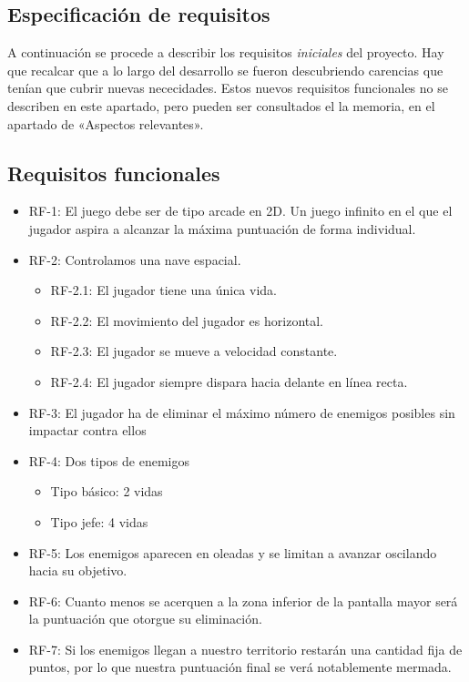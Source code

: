 \subsection{Especificación de requisitos}
A continuación se procede a describir los requisitos \emph{iniciales} del proyecto. Hay que recalcar que a lo largo del desarrollo se fueron descubriendo carencias que tenían que cubrir nuevas nececidades. Estos nuevos requisitos funcionales no se describen en este apartado, pero pueden ser consultados el la memoria, en el apartado de «Aspectos relevantes».

\subsection{Requisitos funcionales}

\begin{itemize}
    \item RF-1: El juego debe ser de tipo arcade en 2D. Un juego infinito en el que el jugador aspira a alcanzar la máxima puntuación de forma individual. 
    \item RF-2: Controlamos una nave espacial.
        \begin{itemize}
            \item RF-2.1: El jugador tiene una única vida.
            \item RF-2.2: El movimiento del jugador es horizontal.
            \item RF-2.3: El jugador se mueve a velocidad constante.
            \item RF-2.4: El jugador siempre dispara hacia delante en línea recta.
        \end{itemize}
    \item RF-3: El jugador ha de eliminar el máximo número de enemigos posibles sin impactar contra ellos
    \item RF-4: Dos tipos de enemigos
        \begin{itemize}
            \item Tipo básico: 2 vidas
            \item Tipo jefe: 4 vidas
        \end{itemize}
    \item RF-5: Los enemigos aparecen en oleadas y se limitan a avanzar oscilando hacia su objetivo.
    \item RF-6: Cuanto menos se acerquen a la zona inferior de la pantalla mayor será la puntuación que otorgue su eliminación.
    \item RF-7: Si los enemigos llegan a nuestro territorio restarán una cantidad fija de puntos, por lo que nuestra puntuación final se verá notablemente mermada.

\end{itemize}
